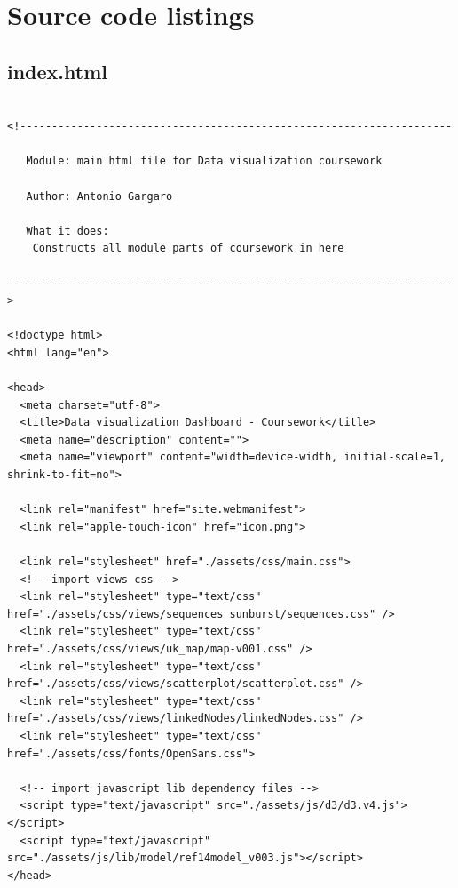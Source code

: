 \documentclass[a4paper, 11pt]{article}
\begin{document}

\newpage
\section*{Source code listings}

\subsection{index.html}

\begin{verbatim}

<!--------------------------------------------------------------------

   Module: main html file for Data visualization coursework

   Author: Antonio Gargaro

   What it does:
  	Constructs all module parts of coursework in here

---------------------------------------------------------------------->

<!doctype html>
<html lang="en">

<head>
  <meta charset="utf-8">
  <title>Data visualization Dashboard - Coursework</title>
  <meta name="description" content="">
  <meta name="viewport" content="width=device-width, initial-scale=1, shrink-to-fit=no">

  <link rel="manifest" href="site.webmanifest">
  <link rel="apple-touch-icon" href="icon.png">

  <link rel="stylesheet" href="./assets/css/main.css">
  <!-- import views css -->
  <link rel="stylesheet" type="text/css" href="./assets/css/views/sequences_sunburst/sequences.css" />
  <link rel="stylesheet" type="text/css" href="./assets/css/views/uk_map/map-v001.css" />
  <link rel="stylesheet" type="text/css" href="./assets/css/views/scatterplot/scatterplot.css" />
  <link rel="stylesheet" type="text/css" href="./assets/css/views/linkedNodes/linkedNodes.css" />
  <link rel="stylesheet" type="text/css" href="./assets/css/fonts/OpenSans.css">

  <!-- import javascript lib dependency files -->
  <script type="text/javascript" src="./assets/js/d3/d3.v4.js"></script>
  <script type="text/javascript" src="./assets/js/lib/model/ref14model_v003.js"></script>
</head>


\end{verbatim}
\end{document}
